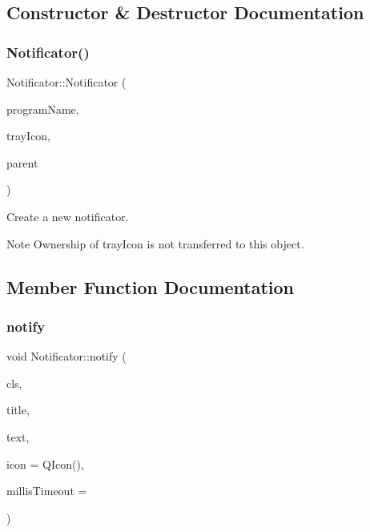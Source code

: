 \subsection{Constructor \& Destructor Documentation}
\mbox{\label{class_notificator_ac98c8b73d4e06ea85e9f58426c5c935d}} 
\subsubsection{\texorpdfstring{Notificator()}{Notificator()}}
{\footnotesize\ttfamily Notificator\+::\+Notificator (\begin{DoxyParamCaption}\item[{const Q\+String \&}]{program\+Name,  }\item[{Q\+System\+Tray\+Icon $\ast$}]{tray\+Icon,  }\item[{Q\+Widget $\ast$}]{parent }\end{DoxyParamCaption})}

Create a new notificator. \begin{DoxyNote}{Note}
Ownership of tray\+Icon is not transferred to this object. 
\end{DoxyNote}


\subsection{Member Function Documentation}
\mbox{\label{class_notificator_ae08e1e7e85ddc4690f307649021f7fdc}} 
\subsubsection{\texorpdfstring{notify}{notify}}
{\footnotesize\ttfamily void Notificator\+::notify (\begin{DoxyParamCaption}\item[{\mbox{\hyperlink{class_notificator_aa2ff8a05d471e32e77584a2b8dd182ab}{Class}}}]{cls,  }\item[{const Q\+String \&}]{title,  }\item[{const Q\+String \&}]{text,  }\item[{const Q\+Icon \&}]{icon = {\ttfamily QIcon()},  }\item[{int}]{millis\+Timeout = {} }\end{DoxyParamCaption})\hspace{0.3cm}{\ttfamily [slot]}}

